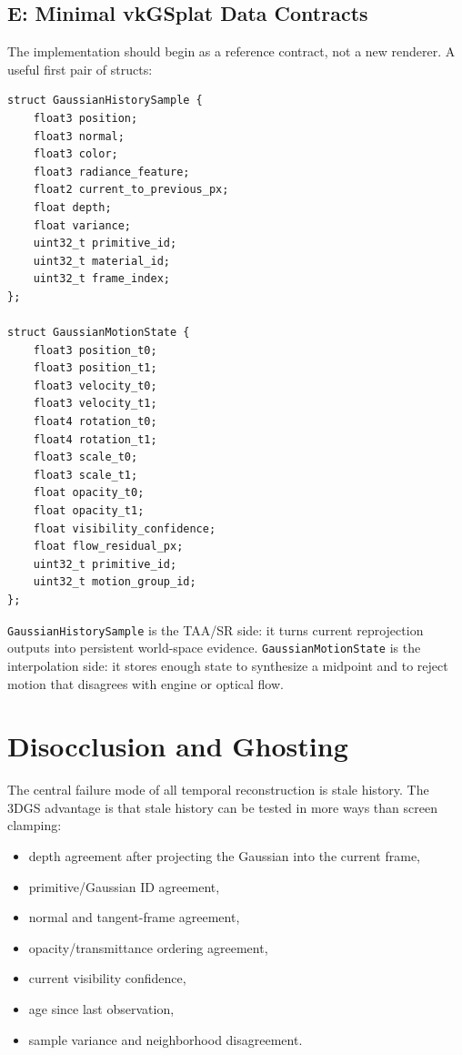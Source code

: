 \documentclass[11pt]{article}
\begin{document}
\subsection{E: Minimal vkGSplat Data Contracts}

The implementation should begin as a reference contract, not a new renderer.
A useful first pair of structs:

\begin{verbatim}
struct GaussianHistorySample {
    float3 position;
    float3 normal;
    float3 color;
    float3 radiance_feature;
    float2 current_to_previous_px;
    float depth;
    float variance;
    uint32_t primitive_id;
    uint32_t material_id;
    uint32_t frame_index;
};

struct GaussianMotionState {
    float3 position_t0;
    float3 position_t1;
    float3 velocity_t0;
    float3 velocity_t1;
    float4 rotation_t0;
    float4 rotation_t1;
    float3 scale_t0;
    float3 scale_t1;
    float opacity_t0;
    float opacity_t1;
    float visibility_confidence;
    float flow_residual_px;
    uint32_t primitive_id;
    uint32_t motion_group_id;
};
\end{verbatim}

\texttt{GaussianHistorySample} is the TAA/SR side: it turns current
reprojection outputs into persistent world-space evidence. \texttt{GaussianMotionState}
is the interpolation side: it stores enough state to synthesize a midpoint and
to reject motion that disagrees with engine or optical flow.

\section{Disocclusion and Ghosting}

The central failure mode of all temporal reconstruction is stale history. The
3DGS advantage is that stale history can be tested in more ways than screen
clamping:

\begin{itemize}
  \item depth agreement after projecting the Gaussian into the current frame,
  \item primitive/Gaussian ID agreement,
  \item normal and tangent-frame agreement,
  \item opacity/transmittance ordering agreement,
  \item current visibility confidence,
  \item age since last observation,
  \item sample variance and neighborhood disagreement.
\end{itemize}
\end{document}
